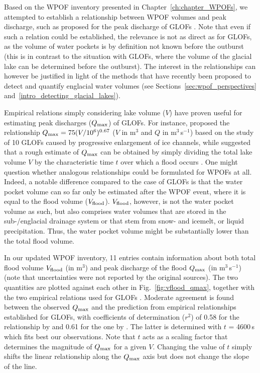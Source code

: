 Based on the WPOF inventory presented in Chapter~\ref{ch:chapter_WPOFs}, we attempted to establish a relationship between WPOF volumes and peak discharge, such as proposed for the peak discharge of GLOFs \citep{Clague&Mathews1973}. Note that even if such a relation could be established, the relevance is not as direct as for GLOFs, as the volume of water pockets is by definition not known before the outburst (this is in contrast to the situation with GLOFs, where the volume of the glacial lake can be determined before the outburst). The interest in the relationships can however be justified in light of the methods that have recently been proposed to detect and quantify englacial water volumes  (see Sections~\ref{sec:wpof_perspectives} and~\ref{intro_detecting_glacial_lakes}).

Empirical relations simply considering lake volume ($V$) have proven useful for estimating peak discharges ($Q_{\rm{max}}$) of GLOFs. For instance, \citet{Clague&Mathews1973} proposed the relationship $Q_{\rm{max}} = 75(V/10^6)^{0.67}$ ($V$ in m$^3$ and $Q$ in m$^3$\,s$^{-1}$) based on the study of 10 GLOFs caused by progressive enlargement of ice channels, while \citet{Haeberli1983} suggested that a rough estimate of $Q_{\rm{max}}$ can be obtained by simply dividing the total lake volume $V$ by the characteristic time $t$ over which a flood occurs \citep[i.e.\ $ Q_{\rm{max}} = V /t$, with $t$ being typically in the order of 800 to 2500\,s in][]{Haeberli1983}. One might question whether analogous relationships could be formulated for WPOFs at all. Indeed, a notable difference compared to the case of GLOFs is that the water pocket volume can so far only be estimated after the WPOF event, where it is equal to the flood volume ($V_{\rm{flood}}$). $V_{\rm{flood}}$, however, is not the water pocket volume as such, but also comprises water volumes that are stored in the sub-/englacial drainage system or that stem from snow- and icemelt, or liquid precipitation. Thus, the water pocket volume might be substantially lower than the total flood volume.

In our updated WPOF inventory, 11 entries contain information about both total flood volume $V_{\rm{flood}}$ (in m$^3$) and peak discharge of the flood $Q_{\rm{max}}$ (in m$^3$\,s$^{-1}$) (note that uncertainties were not reported by the original sources). The two quantities are plotted against each other in Fig.~\ref{fig:vflood_qmax}, together with the two empirical relations used for GLOFs \citep{Clague&Mathews1973,Haeberli1983}. Moderate agreement is found between the observed $Q_{\rm{max}}$ and the prediction from empirical relationships established for GLOFs, with coefficients of determination ($r^2$) of 0.58 for the relationship by \cite{Clague&Mathews1973} and 0.61 for the one by \cite{Haeberli1983}. The latter is determined with $t$ = 4600\,s which fits best our observations. Note that $t$ acts as a scaling factor that determines the magnitude of $Q_{\rm{max}}$ for a given $V$. Changing the value of $t$ simply shifts the linear relationship along the $Q_{\rm{max}}$ axis but does not change the slope of the line. 

